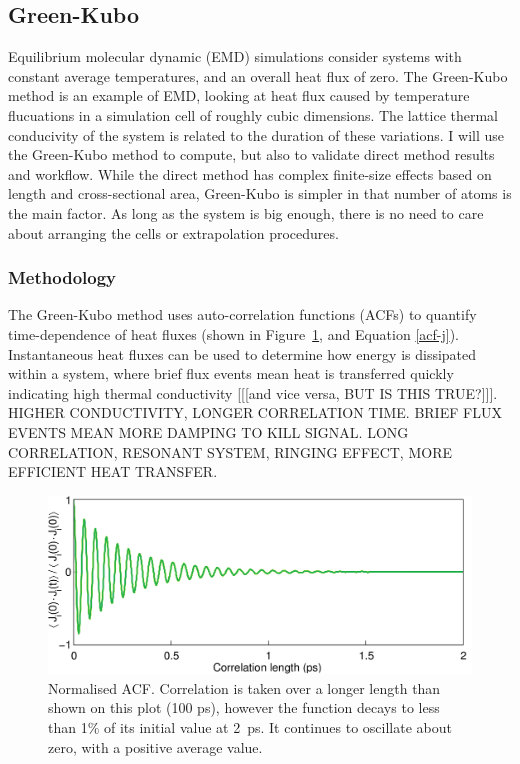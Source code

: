 \subsection{Green-Kubo}

Equilibrium molecular dynamic (EMD) simulations consider systems with constant average temperatures, and an overall heat flux of zero. The Green-Kubo method is an example of EMD, looking at heat flux caused by temperature flucuations in a simulation cell of roughly cubic dimensions. The lattice thermal conducivity of the system is related to the duration of these variations. I will use the Green-Kubo method to compute, but also to validate direct method results and workflow.	While the direct method has complex finite-size effects based on length and cross-sectional area, Green-Kubo is simpler in that number of atoms is the main factor. As long as the system is big enough, there is no need to care about arranging the cells or extrapolation procedures.

\subsubsection{Methodology}

The Green-Kubo method uses auto-correlation functions (ACFs) to quantify time-dependence of heat fluxes (shown in Figure~\ref{fig:gk_acf}, and Equation \ref{acf-j}). Instantaneous heat fluxes can be used to determine how energy is dissipated within a system, where brief flux events mean heat is transferred quickly indicating high thermal conductivity [[[and vice versa, BUT IS THIS TRUE?]]]. HIGHER CONDUCTIVITY, LONGER CORRELATION TIME. BRIEF FLUX EVENTS MEAN MORE DAMPING TO KILL SIGNAL. LONG CORRELATION, RESONANT SYSTEM, RINGING EFFECT, MORE EFFICIENT HEAT TRANSFER.

\begin{figure}[h]
\includegraphics[width=\linewidth]{Figures/gk_acf.png}
\caption{Normalised ACF. Correlation is taken over a longer length than shown on this plot (100 ps), however the function decays to less than 1\% of its initial value at 2~ps. It continues to oscillate about zero, with a positive average value.}
\label{fig:gk_acf}
\end{figure}


